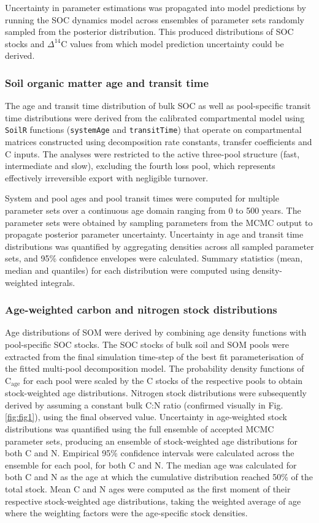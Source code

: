 \documentclass[bg, manuscript]{copernicus}
\begin{document}
Uncertainty in parameter estimations was propagated into model predictions by running the SOC dynamics model across ensembles of parameter sets randomly sampled from the posterior distribution. This produced distributions of SOC stocks and $\Delta^{14}\text{C}$ values from which model prediction uncertainty could be derived.

\subsubsection{Soil organic matter age and transit time}
The age and transit time distribution of bulk SOC as well as pool-specific transit time distributions were derived from the calibrated compartmental model using \texttt{SoilR} functions (\texttt{systemAge} and \texttt{transitTime}) that operate on compartmental matrices constructed using decomposition rate constants, transfer coefficients and C inputs. The analyses were restricted to the active three-pool structure (fast, intermediate and slow), excluding the fourth loss pool, which represents effectively irreversible export with negligible turnover.

System and pool ages and pool transit times were computed for multiple parameter sets over a continuous age domain ranging from 0 to 500 years. The parameter sets were obtained by sampling parameters from the MCMC output to propagate posterior parameter uncertainty. Uncertainty in age and transit time distributions was quantified by aggregating densities across all sampled parameter sets, and 95\% confidence envelopes were calculated. Summary statistics (mean, median and quantiles) for each distribution were computed using density-weighted integrals.

\subsubsection{Age-weighted carbon and nitrogen stock distributions}
Age distributions of SOM were derived by combining age density functions with pool-specific SOC stocks. The SOC stocks of bulk soil and SOM pools were extracted from the final simulation time-step of the best fit parameterisation of the fitted multi-pool decomposition model. The probability density functions of $\text{C}_{\text{age}}$ for each pool were scaled by the C stocks of the respective pools to obtain stock-weighted age distributions. Nitrogen stock distributions were subsequently derived by assuming a constant bulk C:N ratio (confirmed visually in Fig. \ref{fig:fig1}), using the final observed value. Uncertainty in age-weighted stock distributions was quantified using the full ensemble of accepted MCMC parameter sets, producing an ensemble of stock-weighted age distributions for both C and N. Empirical 95\% confidence intervals were calculated across the ensemble for each pool, for both C and N. The median age was calculated for both C and N as the age at which the cumulative distribution reached 50\% of the total stock. Mean C and N ages were computed as the first moment of their respective stock-weighted age distributions, taking the weighted average of age where the weighting factors were the age-specific stock densities.
\end{document}
